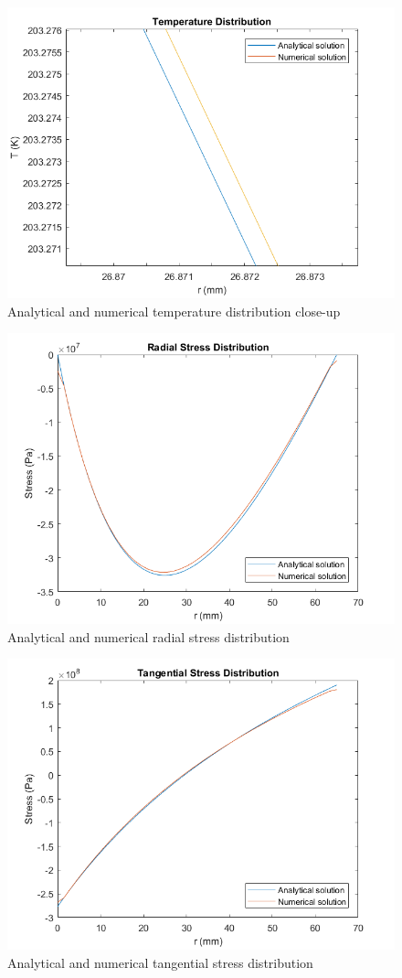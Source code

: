 \begin{figure} [H]
	\centering
	\includegraphics[width=0.8\linewidth]{Figures/tempereture_distribution_disk_zoom.png}
	\caption{Analytical and numerical temperature distribution close-up}
    \label{antempclose}
\end{figure}

\begin{figure} [H]
	\centering
	\includegraphics[width=0.8\linewidth]{Figures/Radialstressfulldisk.png}
	\caption{Analytical and numerical radial stress distribution}
    \label{numanaradstress}
\end{figure}

\begin{figure} [H]
	\centering
	\includegraphics[width=0.8\linewidth]{Figures/Tangentialstressfulldisk.png}
	\caption{Analytical and numerical tangential stress distribution}
    \label{numanatanstress}
\end{figure}



